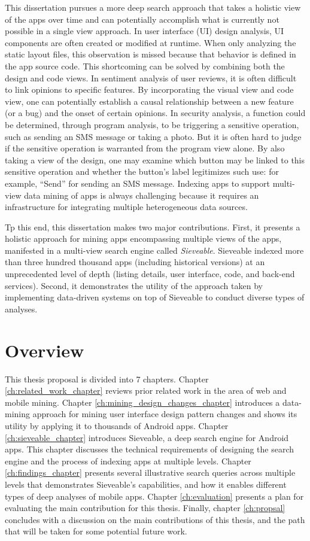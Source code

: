 This dissertation pursues a more deep search approach that takes a holistic view of the apps over time and can potentially accomplish what is currently not possible in a single view approach.
In user interface (UI) design analysis, UI components are often created or modified at runtime.
When only analyzing the static layout files, this observation is missed because that behavior is defined in the app source code.
This shortcoming can be solved by combining both the design and code views.
In sentiment analysis of user reviews, it is often difficult to link opinions to specific features.
By incorporating the visual view and code view, one can potentially establish a causal relationship between a new feature (or a bug) and the onset of certain opinions.
In security analysis, a function could be determined, through program analysis, to be triggering a sensitive operation, such as sending an SMS message or taking a photo.
But it is often hard to judge if the sensitive operation is warranted from the program view alone.
By also taking a view of the design, one may examine which button may be linked to this sensitive operation and whether the button's label legitimizes such use: for example, ``Send'' for sending an SMS message.
Indexing apps to support multi-view data mining of apps is always challenging because it requires an infrastructure for integrating multiple heterogeneous data sources.

Tp this end, this dissertation makes two major contributions.
First, it presents a holistic approach for mining apps encompassing multiple views of the apps, manifested in a multi-view search engine called \textit{Sieveable}.
Sieveable indexed more than three hundred thousand apps (including historical versions) at an unprecedented level of depth (listing details, user interface, code, and back-end services).
Second, it demonstrates the utility of the approach taken by implementing data-driven systems on top of Sieveable to conduct diverse types of analyses.

\section{Overview}
This thesis proposal is divided into 7 chapters.
Chapter \ref{ch:related_work_chapter} reviews prior related work in the area of web and mobile mining.
Chapter \ref{ch:mining_design_changes_chapter} introduces a data-mining approach for mining user interface design pattern changes and shows its utility by applying it to thousands of Android apps.
Chapter \ref{ch:sieveable_chapter} introduces Sieveable, a deep search engine for Android apps. 
This chapter discusses the technical requirements of designing the search engine and the process of indexing apps at multiple levels.
Chapter \ref{ch:findings_chapter} presents several illustrative search queries across multiple levels that demonstrates Sieveable's capabilities, and how it enables different types of deep analyses of mobile apps.
Chapter \ref{ch:evaluation} presents a plan for evaluating the main contribution for this thesis. 
Finally, chapter \ref{ch:propsal} concludes with a discussion on the main contributions of this thesis, and the path that will be taken for some potential future work.